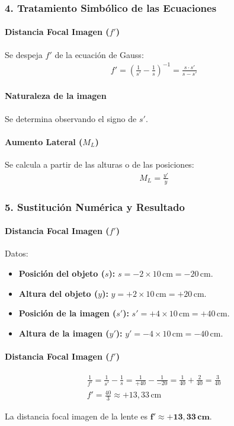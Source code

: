 \subsubsection*{4. Tratamiento Simbólico de las Ecuaciones}
\paragraph{Distancia Focal Imagen ($f'$)}
Se despeja $f'$ de la ecuación de Gauss:
\begin{gather}
    f' = \left(\frac{1}{s'} - \frac{1}{s}\right)^{-1} = \frac{s \cdot s'}{s - s'}
\end{gather}

\paragraph{Naturaleza de la imagen}
Se determina observando el signo de $s'$.

\paragraph{Aumento Lateral ($M_L$)}
Se calcula a partir de las alturas o de las posiciones:
\begin{gather}
    M_L = \frac{y'}{y}
\end{gather}

\subsubsection*{5. Sustitución Numérica y Resultado}
\paragraph{Distancia Focal Imagen ($f'$)}


Datos:
\begin{itemize}
    \item \textbf{Posición del objeto ($s$):} $s = -2 \times 10\,\text{cm} = -20\,\text{cm}$.
    \item \textbf{Altura del objeto ($y$):} $y = +2 \times 10\,\text{cm} = +20\,\text{cm}$.
    \item \textbf{Posición de la imagen ($s'$):} $s' = +4 \times 10\,\text{cm} = +40\,\text{cm}$.
    \item \textbf{Altura de la imagen ($y'$):} $y' = -4 \times 10\,\text{cm} = -40\,\text{cm}$.
\end{itemize}

\paragraph{Distancia Focal Imagen ($f'$)}
\begin{gather}
    \frac{1}{f'} = \frac{1}{s'} - \frac{1}{s} = \frac{1}{+40} - \frac{1}{-20} = \frac{1}{40} + \frac{2}{40} = \frac{3}{40} \nonumber \\
    f' = \frac{40}{3} \approx +13,33\,\text{cm}
\end{gather}
\begin{cajaresultado}
La distancia focal imagen de la lente es $\boldsymbol{f' \approx +13,33\,\textbf{cm}}$.
\end{cajaresultado}

